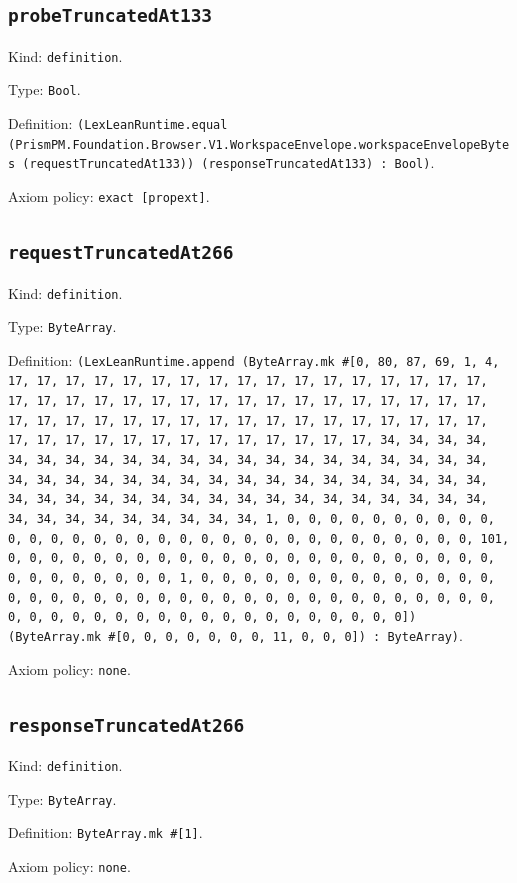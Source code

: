 \documentclass[11pt]{article}
\begin{document}
\subsection*{\texttt{probeTruncatedAt133}}
\noindent Kind: \texttt{definition}.\par
\noindent Type: \texttt{Bool}.\par
\noindent Definition: \texttt{(LexLeanRuntime.equal (PrismPM.Foundation.Browser.V1.WorkspaceEnvelope.workspaceEnvelopeBytes (requestTruncatedAt133)) (responseTruncatedAt133) : Bool)}.\par
\noindent Axiom policy: \texttt{exact [propext]}.\par
\subsection*{\texttt{requestTruncatedAt266}}
\noindent Kind: \texttt{definition}.\par
\noindent Type: \texttt{ByteArray}.\par
\noindent Definition: \texttt{(LexLeanRuntime.append (ByteArray.mk \#[0, 80, 87, 69, 1, 4, 17, 17, 17, 17, 17, 17, 17, 17, 17, 17, 17, 17, 17, 17, 17, 17, 17, 17, 17, 17, 17, 17, 17, 17, 17, 17, 17, 17, 17, 17, 17, 17, 17, 17, 17, 17, 17, 17, 17, 17, 17, 17, 17, 17, 17, 17, 17, 17, 17, 17, 17, 17, 17, 17, 17, 17, 17, 17, 17, 17, 17, 17, 17, 17, 34, 34, 34, 34, 34, 34, 34, 34, 34, 34, 34, 34, 34, 34, 34, 34, 34, 34, 34, 34, 34, 34, 34, 34, 34, 34, 34, 34, 34, 34, 34, 34, 34, 34, 34, 34, 34, 34, 34, 34, 34, 34, 34, 34, 34, 34, 34, 34, 34, 34, 34, 34, 34, 34, 34, 34, 34, 34, 34, 34, 34, 34, 34, 34, 1, 0, 0, 0, 0, 0, 0, 0, 0, 0, 0, 0, 0, 0, 0, 0, 0, 0, 0, 0, 0, 0, 0, 0, 0, 0, 0, 0, 0, 0, 0, 0, 0, 101, 0, 0, 0, 0, 0, 0, 0, 0, 0, 0, 0, 0, 0, 0, 0, 0, 0, 0, 0, 0, 0, 0, 0, 0, 0, 0, 0, 0, 0, 0, 0, 1, 0, 0, 0, 0, 0, 0, 0, 0, 0, 0, 0, 0, 0, 0, 0, 0, 0, 0, 0, 0, 0, 0, 0, 0, 0, 0, 0, 0, 0, 0, 0, 0, 0, 0, 0, 0, 0, 0, 0, 0, 0, 0, 0, 0, 0, 0, 0, 0, 0, 0, 0, 0, 0, 0, 0, 0]) (ByteArray.mk \#[0, 0, 0, 0, 0, 0, 0, 11, 0, 0, 0]) : ByteArray)}.\par
\noindent Axiom policy: \texttt{none}.\par
\subsection*{\texttt{responseTruncatedAt266}}
\noindent Kind: \texttt{definition}.\par
\noindent Type: \texttt{ByteArray}.\par
\noindent Definition: \texttt{ByteArray.mk \#[1]}.\par
\noindent Axiom policy: \texttt{none}.\par
\end{document}

